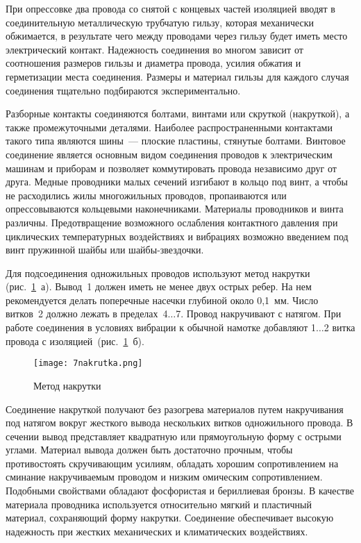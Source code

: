 При опрессовке два провода со снятой с концевых частей изоляцией вводят в соединительную металлическую трубчатую гильзу, которая механически обжимается, в результате чего между проводами через гильзу будет иметь место электрический контакт. Надежность соединения во многом зависит от соотношения размеров гильзы и диаметра провода, усилия обжатия и герметизации места соединения. Размеры и материал гильзы для каждого случая соединения тщательно подбираются экспериментально.

Разборные контакты соединяются болтами, винтами или скруткой (накруткой), а также промежуточными деталями. Наиболее распространенными контактами такого типа являются шины~--- плоские пластины, стянутые болтами. Винтовое соединение является основным видом соединения проводов к электрическим машинам и приборам и позволяет коммутировать провода независимо друг от друга. Медные проводники малых сечений изгибают в кольцо под винт, а чтобы не расходились жилы многожильных проводов, пропаиваются или опрессовываются кольцевыми наконечниками. Материалы проводников и винта различны. Предотвращение возможного ослабления контактного давления при циклических температурных воздействиях и вибрациях возможно введением под винт пружинной шайбы или шайбы-звездочки.

Для подсоединения одножильных проводов используют метод накрутки (рис.~\ref{pic:7nakrutka}~а). Вывод~1 должен иметь не менее двух острых ребер. На нем рекомендуется делать поперечные насечки глубиной около 0,1~мм. Число витков~2 должно лежать в пределах~4$ \ldots $7. Провод накручивают с натягом. При работе соединения в условиях вибрации к обычной намотке добавляют 1$ \ldots $2 витка провода с изоляцией~(рис.~\ref{pic:7nakrutka}~б). 

\begin{figure}[h!]
	\caption{ Метод накрутки }
	\texttt{[image: 7nakrutka.png]}
	\label{pic:7nakrutka}
\end{figure}

Соединение накруткой получают без разогрева материалов путем накручивания под натягом вокруг жесткого вывода нескольких витков одножильного провода. В сечении вывод представляет квадратную или прямоугольную форму с острыми углами. Материал вывода должен быть достаточно прочным, чтобы противостоять скручивающим усилиям, обладать хорошим сопротивлением на сминание накручиваемым проводом и низким омическим сопротивлением. Подобными свойствами обладают фосфористая и бериллиевая бронзы. В качестве материала проводника используется относительно мягкий и пластичный материал, сохраняющий форму накрутки. Соединение обеспечивает высокую надежность при жестких механических и климатических воздействиях.

